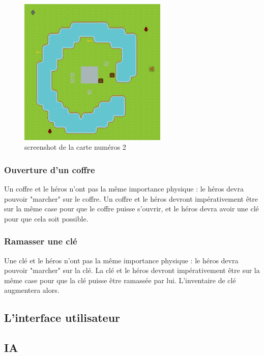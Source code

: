 \documentclass[a4paper 12pts]{article}
\begin{document}
\begin{figure}[h!]
	\includegraphics[width=200pt]{Illustration/screens/screen4.png}
\caption{screenshot de la carte numéros 2}
\end{figure}
\vspace{0.75cm}

\subsubsection {Ouverture d'un coffre}
Un coffre et le héros n'ont pas la même importance physique : le héros devra pouvoir "marcher" sur le coffre.
Un coffre et le héros devront impérativement être sur la même case pour que le coffre puisse s'ouvrir, et le héros devra avoir une clé pour que cela soit possible.


\vspace{0.75cm}

\subsubsection {Ramasser une clé}

\vspace{0.75cm}
Une clé et le héros n'ont pas la même importance physique : le héros devra pouvoir "marcher" sur la clé.
La clé et le héros devront impérativement être sur la même case pour que la clé puisse être ramassée par lui.
L'inventaire de clé augmentera alors.

\vspace{0.75cm} 
\subsection{L'interface utilisateur}

\newpage

\subsection{IA}
\end{document}
